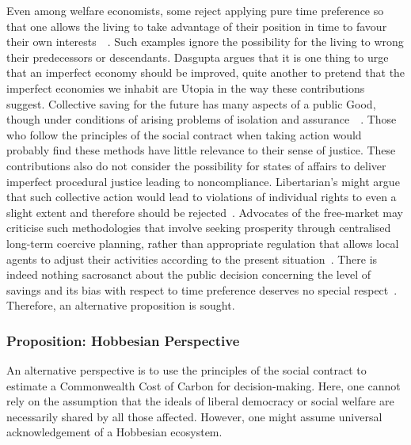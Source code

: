 \documentclass[11pt, oneside]{book}   	%
\begin{document}
Even among welfare economists, some reject applying pure time preference so that one allows the living to take advantage of their position in time to favour their own interests~\cite{hs1}~\cite{fr1}. Such examples ignore the possibility for the living to wrong their predecessors or descendants. Dasgupta argues that it is one thing to urge that an imperfect economy should be improved, quite another to pretend that the imperfect economies we inhabit are Utopia in the way these contributions suggest. Collective saving for the future has many aspects of a public Good, though under conditions of arising problems of isolation and assurance~\cite{as1}~\cite{ms1}.  Those who follow the principles of the social contract when taking action would probably find these methods have little relevance to their sense of justice. These contributions also do not consider the possibility for states of affairs to deliver imperfect procedural justice leading to noncompliance. Libertarian's might argue that such collective action would lead to violations of individual rights to even a slight extent and therefore should be rejected~\cite{rn1}. Advocates of the free-market may criticise such methodologies that involve seeking prosperity through centralised long-term coercive planning, rather than appropriate regulation that allows local agents to adjust their activities according to the present situation~\cite{fh1}. There is indeed nothing sacrosanct about the public decision concerning the level of savings and its bias with respect to time preference deserves no special respect~\cite{jr1}. Therefore, an alternative proposition is sought.

\subsubsection{Proposition: Hobbesian Perspective}

An alternative perspective is to use the principles of the social contract to estimate a Commonwealth Cost of Carbon for decision-making.
Here, one cannot rely on the assumption that the ideals of liberal democracy or social welfare are necessarily shared by all those affected.
However, one might assume universal acknowledgement of a Hobbesian ecosystem.
\end{document}
